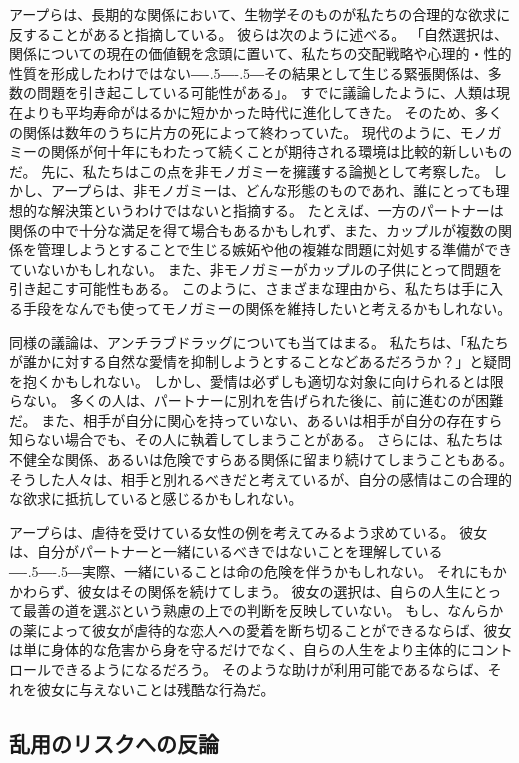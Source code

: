 \documentclass[paper=a4,book,openany]{jlreq}
\def\DDASH{―\kern-.5\zw―\kern-.5\zw―} %
\begin{document}
アープらは、長期的な関係において、生物学そのものが私たちの合理的な欲求に反することがあると指摘している。
彼らは次のように述べる。
「自然選択は、関係についての現在の価値観を念頭に置いて、私たちの交配戦略や心理的・性的性質を形成したわけではない{\DDASH}その結果として生じる緊張関係は、多数の問題を引き起こしている可能性がある」\citep[p.567]{earp12:_natur_selec_child_ethic_marriag_divor}。
すでに議論したように、人類は現在よりも平均寿命がはるかに短かかった時代に進化してきた。
そのため、多くの関係は数年のうちに片方の死によって終わっていた。
現代のように、モノガミーの関係が何十年にもわたって続くことが期待される環境は比較的新しいものだ。
先に、私たちはこの点を非モノガミーを擁護する論拠として考察した。
しかし、アープらは、非モノガミーは、どんな形態のものであれ、誰にとっても理想的な解決策というわけではないと指摘する。
たとえば、一方のパートナーは関係の中で十分な満足を得て場合もあるかもしれず、また、カップルが複数の関係を管理しようとすることで生じる嫉妬や他の複雑な問題に対処する準備ができていないかもしれない。
また、非モノガミーがカップルの子供にとって問題を引き起こす可能性もある\citep[p.48]{earp20:_love_drugs}。
このように、さまざまな理由から、私たちは手に入る手段をなんでも使ってモノガミーの関係を維持したいと考えるかもしれない。

同様の議論は、アンチラブドラッグについても当てはまる。
私たちは、「私たちが誰かに対する自然な愛情を抑制しようとすることなどあるだろうか？」と疑問を抱くかもしれない。
しかし、愛情は必ずしも適切な対象に向けられるとは限らない。
多くの人は、パートナーに別れを告げられた後に、前に進むのが困難だ。
また、相手が自分に関心を持っていない、あるいは相手が自分の存在すら知らない場合でも、その人に執着してしまうことがある。
さらには、私たちは不健全な関係、あるいは危険ですらある関係に留まり続けてしまうこともある。
そうした人々は、相手と別れるべきだと考えているが、自分の感情はこの合理的な欲求に抵抗していると感じるかもしれない。

アープらは、虐待を受けている女性の例を考えてみるよう求めている。
彼女は、自分がパートナーと一緒にいるべきではないことを理解している{\DDASH}実際、一緒にいることは命の危険を伴うかもしれない。
それにもかかわらず、彼女はその関係を続けてしまう。
彼女の選択は、自らの人生にとって最善の道を選ぶという熟慮の上での判断を反映していない。
もし、なんらかの薬によって彼女が虐待的な恋人への愛着を断ち切ることができるならば、彼女は単に身体的な危害から身を守るだけでなく、自らの人生をより主体的にコントロールできるようになるだろう。
そのような助けが利用可能であるならば、それを彼女に与えないことは残酷な行為だ。

\subsection{乱用のリスクへの反論}
\end{document}
